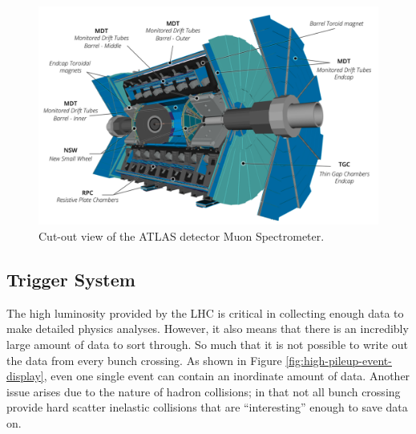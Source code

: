 	\begin{figure}[!ht]
	\centering
	\includegraphics[width=\textwidth,keepaspectratio=true]{chapters/chapter3_experiment/images/ATLAS_Muon_System_Run3.png}
	\caption{Cut-out view of the ATLAS detector Muon Spectrometer.}
	\label{fig:muon-spec}
	\end{figure}

	\subsection{Trigger System}\label{ssec:trigger}
	The high luminosity provided by the LHC is critical in collecting enough data to make detailed physics analyses. However, it also means that there is an incredibly large amount of data to sort through. So much that it is not possible to write out the data from every bunch crossing. As shown in Figure \ref{fig:high-pileup-event-display}, even one single event can contain an inordinate amount of data. Another issue arises due to the nature of hadron collisions; in that not all bunch crossing provide hard scatter inelastic collisions that are ``interesting'' enough to save data on. 

